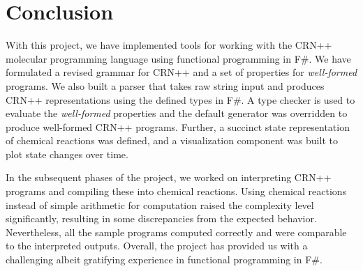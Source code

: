\section{Conclusion}
With this project, we have implemented tools for working with the CRN++ molecular programming language using functional programming in F\#. We have formulated a revised grammar for CRN++ and a set of properties for \textit{well-formed} programs. We also built a parser that takes raw string input and produces CRN++ representations using the defined types in F\#. A type checker is used to evaluate the \textit{well-formed} properties and the default generator was overridden to produce well-formed CRN++ programs. Further, a succinct state representation of chemical reactions was defined, and a visualization component was built to plot state changes over time. 

In the subsequent phases of the project, we worked on interpreting CRN++ programs and compiling these into chemical reactions. Using chemical reactions instead of simple arithmetic for computation raised the complexity level significantly, resulting in some discrepancies from the expected behavior. Nevertheless, all the sample programs computed correctly and were comparable to the interpreted outputs. Overall, the project has provided us with a challenging albeit gratifying experience in functional programming in F\#. 


